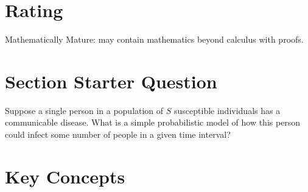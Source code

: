 \documentclass[12pt]{article}
\begin{document}
\myheader \mytitle

\hr


\hr

\section*{Rating} %
Mathematically Mature:  may contain mathematics beyond calculus with
proofs. %

\hr

\section*{Section Starter Question}

Suppose a single person in a population of \( S \) susceptible
individuals has a communicable disease.  What is a simple
probabilistic model of how this person could infect some number of
people in a given time interval?

\hr

\section*{Key Concepts}
\end{document}
